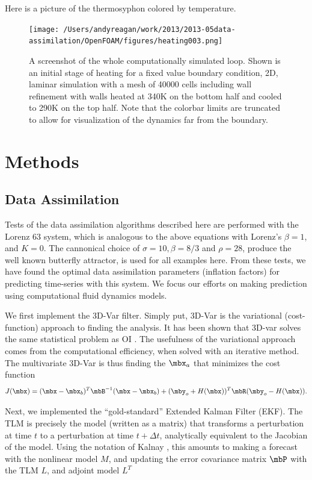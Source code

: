 Here is a picture of the thermosyphon colored by temperature.
\begin{figure}[h!]
  \centering
  \texttt{[image: /Users/andyreagan/work/2013/2013-05data-assimilation/OpenFOAM/figures/heating003.png]}
  \caption[A screenshot of the whole simulated loop]{
  A screenshot of the whole computationally simulated loop.
  Shown is an initial stage of heating for a fixed value boundary condition, 2D, laminar simulation with a mesh of 40000 cells including wall refinement with walls heated at 340K on the bottom half and cooled to 290K on the top half.
  Note that the colorbar limits are truncated to allow for visualization of the dynamics far from the boundary.
  }
  \label{fig:CFDloopSS}
\end{figure}

\section{Methods}

\subsection{Data Assimilation}

Tests of the data assimilation algorithms described here are performed with the Lorenz 63 system, which is analogous to the above equations with Lorenz's $\beta = 1$, and $K = 0$.
The cannonical choice of $\sigma = 10, \beta = 8/3$ and $\rho = 28$, produce the well known butterfly attractor, is used for all examples here.
From these tests, we have found the optimal data assimilation parameters (inflation factors) for predicting time-series with this system.
We focus our efforts on making prediction using computational fluid dynamics models.

We first implement the 3D-Var filter.
Simply put, 3D-Var is the variational (cost-function) approach to finding the analysis.
It has been shown that 3D-var solves the same statistical problem as OI \cite{lorenc1986analysis}.
The usefulness of the variational approach comes from the computational efficiency, when solved with an iterative method.
The multivariate 3D-Var is thus finding the $\mbx _a$ that minimizes the cost function
\begin{equation} J(\mbx) = (\mbx - \mbx_b) ^T \mbB ^{-1} (\mbx - \mbx_b) + (\mby_o + H(\mbx))^T\mbR (\mby_o - H(\mbx)) .\end{equation}

Next, we implemented the ``gold-standard'' Extended Kalman Filter (EKF).
The TLM is precisely the model (written as a matrix) that transforms a perturbation at time $t$ to a perturbation at time $t+\Delta t$, analytically equivalent to the Jacobian of the model.
Using the notation of Kalnay \cite{kalnay2003}, this amounts to making a forecast with the nonlinear model $M$, and updating the error covariance matrix $\mbP$ with the TLM $L$, and adjoint model $L^T$

